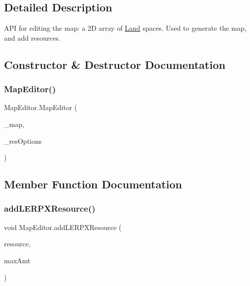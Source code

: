 \subsection{Detailed Description}
A\+PI for editing the map\+: a 2D array of \mbox{\hyperlink{class_land}{Land}} spaces. Used to generate the map, and add resources. 



\subsection{Constructor \& Destructor Documentation}
\mbox{\label{class_map_editor_acc8af16a98b138b39e1c0e8f3d3ad83b}} 
\subsubsection{\texorpdfstring{Map\+Editor()}{MapEditor()}}
{\footnotesize\ttfamily Map\+Editor.\+Map\+Editor (\begin{DoxyParamCaption}\item[{List$<$ List$<$ \mbox{\hyperlink{class_land}{Land}} $>$$>$}]{\+\_\+map,  }\item[{Dictionary$<$ string, \mbox{\hyperlink{class_resource_store}{Resource\+Store}} $>$}]{\+\_\+res\+Options }\end{DoxyParamCaption})}



\subsection{Member Function Documentation}
\mbox{\label{class_map_editor_a3f0e4bacb89992b0aa0aaa4f17aafd28}} 
\subsubsection{\texorpdfstring{add\+L\+E\+R\+P\+X\+Resource()}{addLERPXResource()}}
{\footnotesize\ttfamily void Map\+Editor.\+add\+L\+E\+R\+P\+X\+Resource (\begin{DoxyParamCaption}\item[{string}]{resource,  }\item[{float}]{max\+Amt }\end{DoxyParamCaption})}

